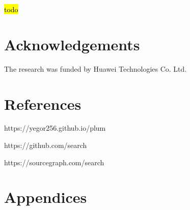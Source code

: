\documentclass[anonymous,sigplan,review,11pt,nonacm,natbib=false]{acmart}
\begin{document}
    \hl{todo}

    \section{Acknowledgements}

    The research was funded by Huawei Technologies Co. Ltd.

    \section{References}

    https://yegor256.github.io/plum

    https://github.com/search

    https://sourcegraph.com/search

    \section{Appendices}

    \label{table 1}
\end{document}

